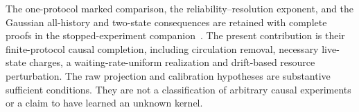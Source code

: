 The one-protocol marked comparison, the reliability--resolution exponent, and the Gaussian all-history and two-state consequences are retained with complete proofs in the stopped-experiment companion~\cite{GTF52}. The present contribution is their finite-protocol causal completion, including circulation removal, necessary live-state charges, a waiting-rate-uniform realization and drift-based resource perturbation. The raw projection and calibration hypotheses are substantive sufficient conditions. They are not a classification of arbitrary causal experiments or a claim to have learned an unknown kernel.
